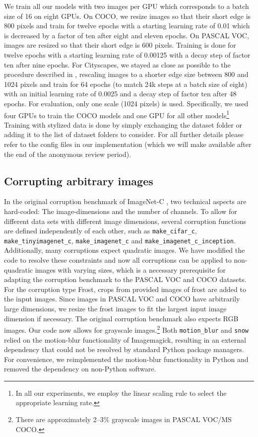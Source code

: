 \documentclass{article}
\def\code#1{\texttt{#1}}
\begin{document}
We train all our models with two images per GPU which corresponds to a batch size of 16 on eight GPUs. On COCO, we resize images so that their short edge is 800 pixels and train for twelve epochs with a starting learning rate of 0.01 which is decreased by a factor of ten after eight and eleven epochs. On PASCAL VOC, images are resized so that their short edge is 600 pixels. Training is done for twelve epochs with a starting learning rate of 0.00125 with a decay step of factor ten after nine epochs. For Cityscapes, we stayed as close as possible to the procedure described in \citep{He2017}, rescaling images to a shorter edge size between 800 and 1024 pixels and train for 64 epochs (to match 24k steps at a batch size of eight) with an initial learning rate of 0.0025 and a decay step of factor ten after 48 epochs. For evaluation, only one scale (1024 pixels) is used. Specifically, we used four GPUs to train the COCO models and one GPU for all other models\footnote{In all our experiments, we employ the linear scaling rule \citep{Goyal2017linearscalingrule} to select the appropriate learning rate.} Training with stylized data is done by simply exchanging the dataset folder or adding it to the list of dataset folders to consider. For all further details please refer to the config files in our implementation (which we will make available after the end of the anonymous review period).









\subsection{Corrupting arbitrary images}
In the original corruption benchmark of ImageNet-C \citep{hendrycks2018benchmarking}, two technical aspects are hard-coded: The image-dimensions and the number of channels. To allow for different data sets with different image dimensions, several corruption functions are defined independently of each other, such as \code{make\_cifar\_c}, \code{make\_tinyimagenet\_c}, \code{make\_imagenet\_c} and \code{make\_imagenet\_c\_inception}. Additionally, many corruptions expect quadratic images. We have modified the code to resolve these constraints and now all corruptions can be applied to non-quadratic images with varying sizes, which is a necessary prerequisite for adapting the corruption benchmark to the PASCAL VOC and COCO datasets.
For the corruption type Frost, crops from provided images of frost are added to the input images. Since images in PASCAL VOC and COCO have arbitrarily large dimensions, we resize the frost images to fit the largest input image dimension if necessary.  The original corruption benchmark also expects RGB images. Our code now allows for grayscale images.\footnote{There are approximately 2--3\% grayscale images in PASCAL VOC/MS COCO.}
Both \texttt{motion\_blur} and \texttt{snow} relied on the motion-blur functionality of Imagemagick, resulting in an external dependency that could not be resolved by standard Python package managers. For convenience, we reimplemented the motion-blur functionality in Python and removed the dependency on non-Python software.
\end{document}
